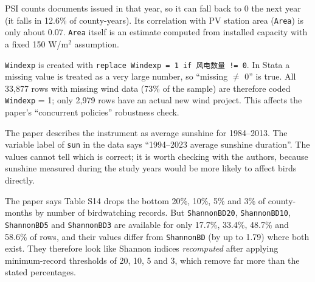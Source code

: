 \documentclass[10pt]{article}
\begin{document}
\begin{warnbox}
\small
PSI counts documents issued in that year, so it can fall back to 0 the next year (it falls in 12.6\% of county-years). Its correlation with PV station area (\texttt{Area}) is only about 0.07. \texttt{Area} itself is an estimate computed from installed capacity with a fixed 150 W/m$^2$ assumption.
\end{warnbox}

\begin{warnbox}
\small
\texttt{Windexp} is created with \texttt{replace Windexp = 1 if {\cjk 风电数量} != 0}. In Stata a missing value is treated as a very large number, so ``missing $\neq$ 0'' is true. All 33,877 rows with missing wind data (73\% of the sample) are therefore coded \texttt{Windexp} = 1; only 2,979 rows have an actual new wind project. This affects the paper's ``concurrent policies'' robustness check.
\end{warnbox}

\begin{warnbox}
\small
The paper describes the instrument as average sunshine for 1984--2013. The variable label of \texttt{sun} in the data says ``1994--2023 average sunshine duration''. The values cannot tell which is correct; it is worth checking with the authors, because sunshine measured during the study years would be more likely to affect birds directly.
\end{warnbox}

\begin{warnbox}
\small
The paper says Table S14 drops the bottom 20\%, 10\%, 5\% and 3\% of county-months by number of birdwatching records. But \texttt{ShannonBD20}, \texttt{ShannonBD10}, \texttt{ShannonBD5} and \texttt{ShannonBD3} are available for only 17.7\%, 33.4\%, 48.7\% and 58.6\% of rows, and their values differ from \texttt{ShannonBD} (by up to 1.79) where both exist. They therefore look like Shannon indices \emph{recomputed} after applying minimum-record thresholds of 20, 10, 5 and 3, which remove far more than the stated percentages.
\end{warnbox}
\end{document}
